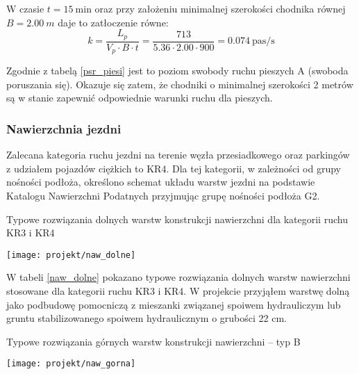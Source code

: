 \documentclass[twoside,12pt]{article}
\begin{document}
     W czasie $t=15 \ \text{min}$ oraz przy założeniu minimalnej szerokości chodnika równej $B=\SI{2.00}{m}$ daje to zatłoczenie równe:
     \begin{equation}
     k=\frac{L_p}{V_p \cdot B \cdot t} = \frac{713}{5.36 \cdot 2.00 \cdot 900} = 0.074 \ \text{pas/s}
     \end{equation}
     
     Zgodnie z tabelą \ref{psr_piesi} jest to poziom swobody ruchu pieszych A (swoboda poruszania się). Okazuje się zatem, że chodniki o minimalnej szerokości 2 metrów są w stanie zapewnić odpowiednie warunki ruchu dla pieszych.
     
     \subsubsection{Nawierzchnia jezdni}
     
     Zalecana kategoria ruchu jezdni na terenie węzła przesiadkowego oraz parkingów z udziałem pojazdów ciężkich to KR4. Dla tej kategorii, w zależności od grupy nośności podłoża, określono schemat układu warstw jezdni na podstawie Katalogu Nawierzchni Podatnych \cite{knd_podatne} przyjmując grupę nośności podłoża G2. 
     
    \begin{table}[H]
		\centering
		\caption{Typowe rozwiązania dolnych warstw konstrukcji nawierzchni dla kategorii ruchu KR3 i KR4}
		\texttt{[image: projekt/naw\_dolne]}
		\label{naw_dolne}
		\end{table}
		
		W tabeli \ref{naw_dolne} pokazano typowe rozwiązania dolnych warstw nawierzchni stosowane dla kategorii ruchu KR3 i KR4. W projekcie przyjąłem warstwę dolną jako podbudowę pomocniczą z mieszanki związanej spoiwem hydrauliczym lub gruntu stabilizowanego spoiwem hydraulicznym o grubości 22 cm.
		
		\begin{table}[H]
		\centering
		\caption{Typowe rozwiązania górnych warstw konstrukcji nawierzchni -- typ B}
		\texttt{[image: projekt/naw\_gorna]}
		\label{naw_gorna}
		\end{table}
		
\end{document}
